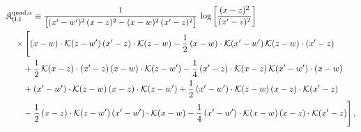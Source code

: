\begingroup\small
\begin{align}\label{eq:K-rm_quad_a_rm_II_I}
&\mathfrak{K}^{{\rm quad},a}_{\rm II.I}\equiv \frac{1}{\big[(x'-w')^{2}\,(x-z)^{2}-(x-w)^{2}\,(x'-z)^{2}\big]}\, \log\left[\frac{(x-z)^{2}}{(x'-z)^{2}}\right]\notag\\
&\quad \times\Bigg[(x-w)\cdot\mathcal{K}(z-w')\, (x'-z)\cdot\mathcal{K}(z-w) -\frac{1}{2}\, (x-w)\cdot\mathcal{K}(x'-w')\, \mathcal{K}(z-w)\cdot(x'-z)\notag\\
&\quad\quad +\frac{1}{2}\, \mathcal{K}(x-z)\cdot(x'-z)\, (x-w)\cdot\mathcal{K}(z-w') -\frac{1}{4}\, (x'-z)\cdot\mathcal{K}(x-z)\, \mathcal{K}(x'-w')\cdot(x-w)\notag\\
&\quad\quad +(x'-w')\cdot\mathcal{K}(z-w)\, (x-z)\cdot\mathcal{K}(z-w') +\frac{1}{2}\, (x'-w')\cdot\mathcal{K}(z-w)\, (x-z)\cdot\mathcal{K}(x'-z)\notag\\
&\quad\quad -\frac{1}{2}\, (x-z)\cdot\mathcal{K}(z-w')\, (x'-w')\cdot\mathcal{K}(x-w) -\frac{1}{4}\, (x'-w')\cdot\mathcal{K}(x-w)\, (x-z)\cdot\mathcal{K}(x'-z)\Bigg]\,,
\end{align}
\endgroup
